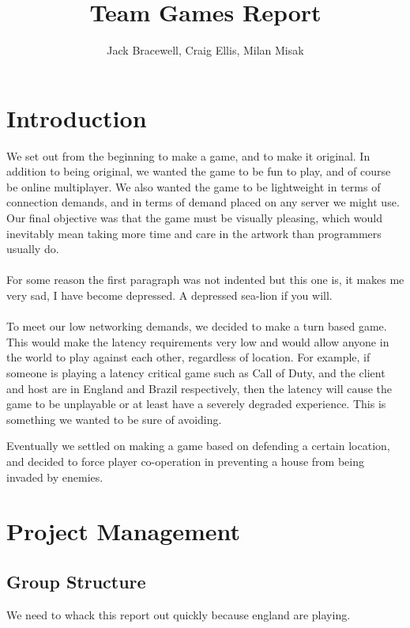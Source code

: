 \documentclass{article}
\begin{document}
\title{Team Games Report}
\author{Jack Bracewell, Craig Ellis, Milan Misak}
\date{}

\maketitle
\vspace{1.5cm}
\tableofcontents
\clearpage

\section{Introduction}
We set out from the beginning to make a game, and to make it original. In addition to being original, we wanted the game to be fun to play, and of course be online multiplayer. We also wanted the game to be lightweight in terms of connection demands, and in terms of demand placed on any server we might use. Our final objective was that the game must be visually pleasing, which would inevitably mean taking more time and care in the artwork than programmers usually do. \\ \\

For some reason the first paragraph was not indented but this one is, it makes me very sad, I have become depressed. A depressed sea-lion if you will. \\ \\

To meet our low networking demands, we decided to make a turn based game. This would make the latency requirements very low and would allow anyone in the world to play against each other, regardless of location. For example, if someone is playing a latency critical game such as Call of Duty, and the client and host are in England and Brazil respectively, then the latency will cause the game to be unplayable or at least have a severely degraded experience. This is something we wanted to be sure of avoiding.

Eventually we settled on making a game based on defending a certain location, and decided to force player co-operation in preventing a house from being invaded by enemies.




\section{Project Management}
\subsection{Group Structure}
We need to whack this report out quickly because england are playing.
\end{document}
